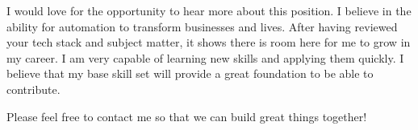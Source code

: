 
I would love for the opportunity to hear more about this position. I believe in the ability for automation to transform businesses and lives. After having reviewed your tech stack and subject matter, it shows there is room here for me to grow in my career. I am very capable of learning new skills and applying them quickly. I believe that my base skill set will provide a great foundation to be able to contribute.

Please feel free to contact me so that we can build great things together!
